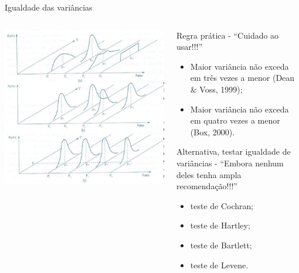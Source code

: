 \documentclass{bredelebeamer}
\begin{document}
\begin{frame}
\begin{alertblock}{Igualdade das variâncias}
\begin{columns}
\begin{column}{.5\textwidth}
\centering
\includegraphics[scale=.18]{images/variancia.png}
\end{column}

\begin{column}{.45\textwidth}
\begin{center}
\footnotesize{
Regra prática - ``Cuidado ao usar!!!''
\begin{itemize}
\item Maior variância não exceda em três vezes a menor (Dean \& Voss,
  1999);
\item Maior variância não exceda em quatro vezes a menor (Box, 2000).
\end{itemize}
}

\vspace{.1cm}

\pause
\footnotesize{
Alternativa, testar igualdade de variâncias - ``Embora nenhum deles
tenha ampla recomendação!!!''
\begin{itemize}
\item teste de Cochran;
\item teste de Hartley;
\item teste de Bartlett;
\item teste de Levene.
\end{itemize}
}
\end{center}
\end{column}
\end{columns}
\end{alertblock}
\end{frame}
\end{document}
